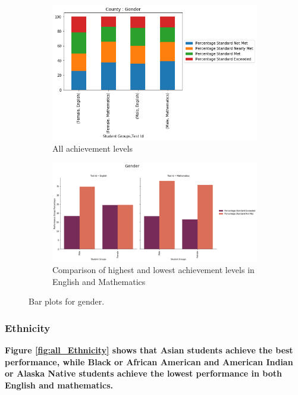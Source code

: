 \documentclass[11pt]{article}
\begin{document}
\begin{figure}[h!]
\centering
\begin{subfigure}{0.35\textwidth}
         \centering
         \includegraphics[width=\textwidth]{output_24_0.png}
         \caption{All achievement levels}
         \label{fig:gender_all}
\end{subfigure}
\hfill
\begin{subfigure}{0.6\textwidth}
         \centering
         \includegraphics[width=\textwidth]{output_26_1.png}
         \caption{Comparison of highest and lowest achievement levels 
in English and Mathematics}
         \label{fig:gender_two}
\end{subfigure}
\caption{Bar plots for gender.}
\label{fig:all_gender}
\end{figure}

\subsubsection{Ethnicity}
\textbf{Figure \ref{fig:all_Ethnicity} shows that Asian students achieve the best performance, while Black or African American and American Indian or Alaska Native students achieve the lowest performance in both English and mathematics.}
\end{document}
